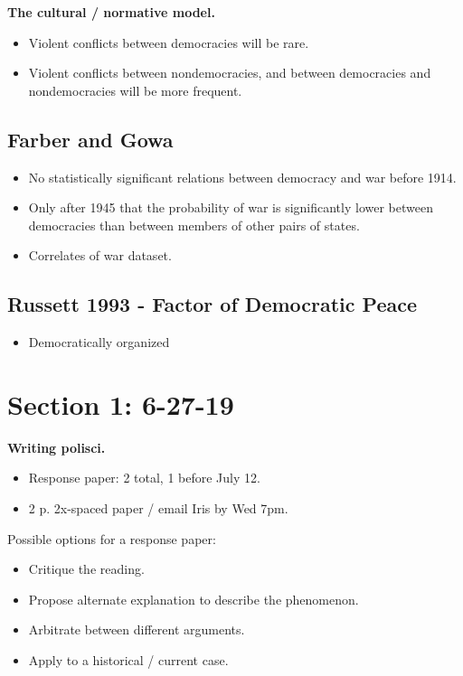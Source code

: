 \documentclass{article}
\begin{document}
{\bf The cultural / normative model.}

\begin{itemize}
  \item Violent conflicts between democracies will be rare.
  \item Violent conflicts between nondemocracies, and between democracies and nondemocracies will be more frequent.
\end{itemize}

\subsection{Farber and Gowa}

\begin{itemize}
  \item No statistically significant relations between democracy and war before 1914.
  \item Only after 1945 that the probability of war is significantly lower between democracies than between members of other pairs of states.
  \item Correlates of war dataset.
\end{itemize}

\subsection{Russett 1993 - Factor of Democratic Peace}

\begin{itemize}
  \item Democratically organized 
\end{itemize}


\section{Section 1: 6-27-19}

{\bf Writing polisci.}
\begin{itemize}
  \item Response paper: 2 total, 1 before July 12.
  \item 2 p. 2x-spaced paper / email Iris by Wed 7pm.
\end{itemize}

Possible options for a response paper:
\begin{itemize}
  \item Critique the reading.
  \item Propose alternate explanation to describe the phenomenon.
  \item Arbitrate between different arguments.
  \item Apply to a historical / current case.
\end{itemize}
\end{document}
